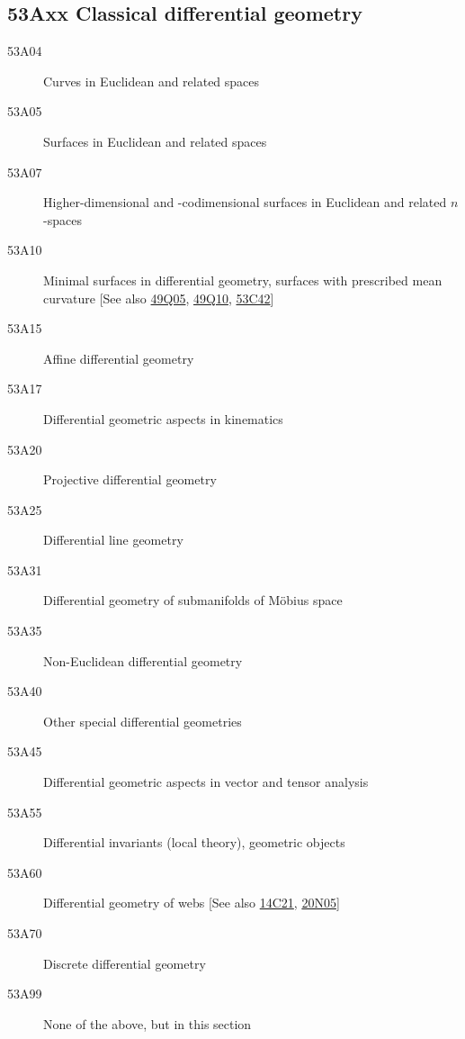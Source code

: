 \subsection*{53Axx  Classical differential geometry }\label{53Axx}
\begin{description} 
\item [53A04]\label{53A04} Curves in Euclidean and related spaces
\item [53A05]\label{53A05} Surfaces in Euclidean and related spaces
\item [53A07]\label{53A07} Higher-dimensional and -codimensional surfaces in Euclidean and related $n$-spaces
\item [53A10]\label{53A10} Minimal surfaces in differential geometry, surfaces with prescribed mean curvature [See also \hyperref[49Q05]{49Q05}, \hyperref[49Q10]{49Q10}, \hyperref[53C42]{53C42}]
\item [53A15]\label{53A15} Affine differential geometry
\item [53A17]\label{53A17} Differential geometric aspects in kinematics
\item [53A20]\label{53A20} Projective differential geometry
\item [53A25]\label{53A25} Differential line geometry
\item [53A31]\label{53A31} Differential geometry of submanifolds of M\"obius space
\item [53A35]\label{53A35} Non-Euclidean differential geometry
\item [53A40]\label{53A40} Other special differential geometries
\item [53A45]\label{53A45} Differential geometric aspects in vector and tensor analysis
\item [53A55]\label{53A55} Differential invariants (local theory), geometric objects
\item [53A60]\label{53A60} Differential geometry of webs [See also \hyperref[14C21]{14C21}, \hyperref[20N05]{20N05}]
\item [53A70]\label{53A70} Discrete differential geometry
\item [53A99]\label{53A99} None of the above, but in this section
\end{description}
